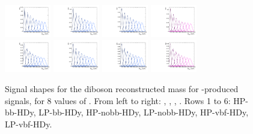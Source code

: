 \begin{figure}[htbp]
  \includegraphics[width=0.18\textwidth]{fig/2Dfit/templateSignalVsMX_fromDC_VBFGbuToWW_MVV_mu_HP_vbf_HDy.pdf}
  \includegraphics[width=0.18\textwidth]{fig/2Dfit/templateSignalVsMX_fromDC_VBFRadToWW_MVV_mu_HP_vbf_HDy.pdf}
  \includegraphics[width=0.18\textwidth]{fig/2Dfit/templateSignalVsMX_fromDC_VBFZprToWW_MVV_mu_HP_vbf_HDy.pdf}
  \includegraphics[width=0.18\textwidth]{fig/2Dfit/templateSignalVsMX_fromDC_VBFWprToWZ_MVV_mu_HP_vbf_HDy.pdf}\\
  \includegraphics[width=0.18\textwidth]{fig/2Dfit/templateSignalVsMX_fromDC_VBFGbuToWW_MVV_mu_LP_vbf_HDy.pdf}
  \includegraphics[width=0.18\textwidth]{fig/2Dfit/templateSignalVsMX_fromDC_VBFRadToWW_MVV_mu_LP_vbf_HDy.pdf}
  \includegraphics[width=0.18\textwidth]{fig/2Dfit/templateSignalVsMX_fromDC_VBFZprToWW_MVV_mu_LP_vbf_HDy.pdf}
  \includegraphics[width=0.18\textwidth]{fig/2Dfit/templateSignalVsMX_fromDC_VBFWprToWZ_MVV_mu_LP_vbf_HDy.pdf}\\
  \caption{
    Signal shapes for the diboson reconstructed mass \MVV for \VBF-produced signals, for 8 values of \MX.
    From left to right: \GBulktoWW, \RadtoWW, \ZprtoWW, \WprtoWZ.
    Rows 1 to 6: HP-bb-HDy, LP-bb-HDy, HP-nobb-HDy, LP-nobb-HDy, HP-vbf-HDy, LP-vbf-HDy.
  }
  \label{fig:MVVShapes_VBF_HDy_Run2}
\end{figure}

